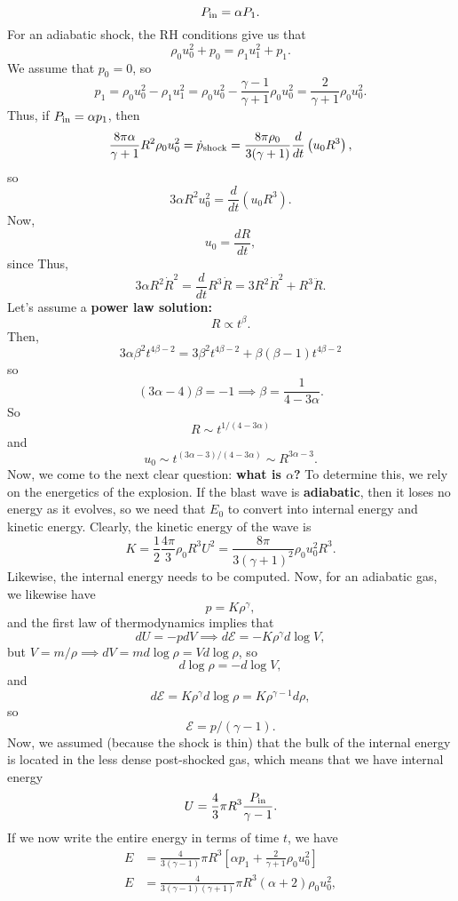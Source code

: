 \[
P_{\rm in} = \alpha P_{1}.
\]
 For an adiabatic shock, the RH conditions give us that
\[
\rho_0 u_0^2 + p_0 = \rho_1u_1^2 + p_1.
\]
We assume that $p_0 = 0$, so 
\[
p_1 = \rho_0u_0^2 - \rho_1 u_1^2 = \rho_0u_0^2 - \frac{\gamma - 1}{\gamma + 1} \rho_0 u_0^2 = \frac{2}{\gamma +1} \rho_0 u_0^2.
\]
Thus, if $P_{\rm in} = \alpha p_1$, then
\[
\frac{8\pi \alpha}{\gamma +1} R^2\rho_0u_0^2 = \dot{p}_{\rm shock} = \frac{8\pi \rho_0}{3(\gamma + 1)} \frac{d}{dt}\left(u_0R^3\right),
\]
so
\[
3\alpha R^2 u_0^2 = \frac{d}{dt} \left(u_0 R^3\right) .
\]
Now,
\[
u_0 = \frac{dR}{dt},
\]
since  Thus,
\[
3\alpha R^2 \dot{R}^2 = \frac{d}{dt} R^3 \dot{R} = 3R^2 \dot{R}^2 + R^3 \ddot{R}.
\]
Let's assume a \textbf{power law solution:}
\[
R \propto t^\beta.
\]
Then, 
\[
3\alpha \beta^2 t^{4\beta -2} = 3\beta^2t^{4\beta -2} + \beta(\beta-1)t^{4\beta -2}
\]
so
\[
(3\alpha -4)\beta = - 1 \implies \beta =\frac{1}{4-3\alpha}.
\]
So
\[
\boxed{
R \sim t^{1/(4-3\alpha)}
}
\]
and
\[
\boxed{
u_0 \sim t^{(3\alpha -3)/(4-3\alpha)} \sim R^{3\alpha -3}.
}
\]
Now, we come to the next clear question: \textbf{what is $\alpha$?} To determine this, we rely on the energetics of the explosion. If the blast wave is \textbf{adiabatic}, then it loses no energy as it evolves, so we need that $E_0$ to convert into internal energy and kinetic energy. Clearly, the kinetic energy of the wave is
\[
K = \frac{1}{2} \frac{4\pi}{3} \rho_0 R^3 U^2 = \frac{8\pi}{3(\gamma +1)^2} \rho_0u_0^2R^3.
\]
Likewise, the internal energy needs to be computed. Now, for an adiabatic gas, we likewise have
\[
p =K \rho^\gamma,
\]
and the first law of thermodynamics implies that
\[
dU = - pdV \implies d\mathcal{E} = - K\rho^\gamma d\log V,
\]
but $V = m/\rho \implies dV = m d \log \rho  = V d\log \rho$, so
\[
d\log \rho = - d\log V,
\]
and
\[
d\mathcal{E} = K \rho^{\gamma} d\log \rho = K \rho^{\gamma -1} d\rho,
\]
so
\[
\mathcal{E} = p/(\gamma -1).
\]
Now, we assumed (because the shock is thin) that the bulk of the internal energy is located in the less dense post-shocked gas, which means that we have internal energy
\[
U = \frac{4}{3}\pi R^3\frac{P_{\rm in}}{\gamma -1}.
\]
If we now write the entire energy in terms of time $t$, we have
\[
\begin{aligned}
    E &= \frac{4}{3(\gamma -1)}\pi R^3\left[\alpha p_1 + \frac{2}{\gamma +1} \rho_0u_0^2\right]\\
    E &=  \frac{4}{3(\gamma -1)(\gamma+1)}\pi R^3\left(\alpha+ 2\right) \rho_0u_0^2,\\
\end{aligned}
\]
